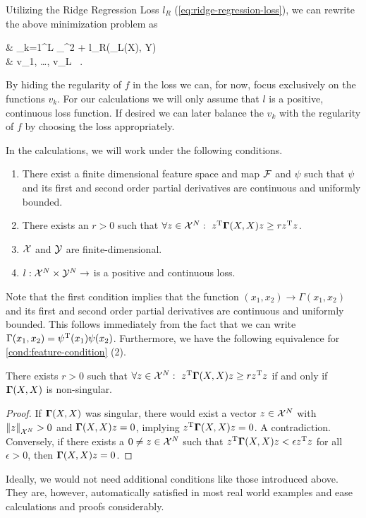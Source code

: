 Utilizing the Ridge Regression Loss $l_R$ (\cref{eq:ridge-regression-loss}), we can rewrite the above minimization problem as
\begin{problem}
	\begin{cases}
		 & \nu \cdot {} \sum_{k=1}^{L} _\cV^2
		+ l_R(\Phi_L(X), Y) \\
		 & v_1, \ldots, v_L \in \cV\ .
	\end{cases}
\end{problem}
By hiding the regularity of $f$ in the loss we can, for now, focus exclusively on the functions $v_k$.
For our calculations we will only assume that $l$ is a positive, continuous loss function.
If desired we can later balance the $v_k$ with the regularity of $f$ by choosing the loss appropriately.

In the calculations, we will work under the following conditions.
\begin{condition}
	\label{cond:feature-condition}\mbox{}
	\vspace*{-\parsep}
	\vspace*{-\baselineskip}
	\begin{enumerate}
		\item There exist a finite dimensional feature space and map $\mathcal{F}$ and $\psi$ such that $\psi$ and its first and second order partial derivatives are continuous and uniformly bounded.
		\item There exists an $r > 0$ such that $\forall z \in \mathcal{X}^N:~z^{\mathrm{T}} \mathbf{\Gamma}(X, X) z \geq r z^{\mathrm{T}} z$.
		\item $\mathcal{X}$ and $\mathcal{Y}$ are finite-dimensional.
		\item $l: \mathcal{X}^N \times \mathcal{Y}^N \rightarrow$ is a positive and continuous loss.
	\end{enumerate}
\end{condition}
Note that the first condition implies that the function $(x_1, x_2) \rightarrow \Gamma(x_1, x_2)$ and its first and second order partial derivatives are continuous and uniformly bounded.
This follows immediately from the fact that we can write $\Gamma(x_1, x_2) = \psi^{\mathrm{T}}(x_1)\psi(x_2)$.
Furthermore, we have the following equivalence for \cref{cond:feature-condition} (2).
\begin{lemma}
	There exists $r > 0$ such that $\forall z \in \mathcal{X}^N:~z^{\mathrm{T}} \mathbf{\Gamma}(X, X) z \geq r z^{\mathrm{T}} z$ if and only if $\mathbf{\Gamma}(X, X)$ is non-singular.
\end{lemma}
\begin{proof}
	If $\mathbf{\Gamma}(X, X)$ was singular, there would exist a vector $z \in \mathcal{X}^N$ with $\norm{z}_{\mathcal{X}^N} > 0$ and $\mathbf{\Gamma}(X, X) z = 0$, implying $z^{\mathrm{T}} \mathbf{\Gamma}(X, X)z = 0$. 
	A contradiction.
	Conversely, if there exists a $0 \neq z \in \mathcal{X}^N$ such that $z^{\mathrm{T}} \mathbf{\Gamma}(X, X) z < \epsilon z^{\mathrm{T}} z$ for all $\epsilon > 0$, then $\mathbf{\Gamma}(X, X) z = 0$.
\end{proof}
Ideally, we would not need additional conditions like those introduced above.
They are, however, automatically satisfied in most real world examples and ease calculations and proofs considerably.

